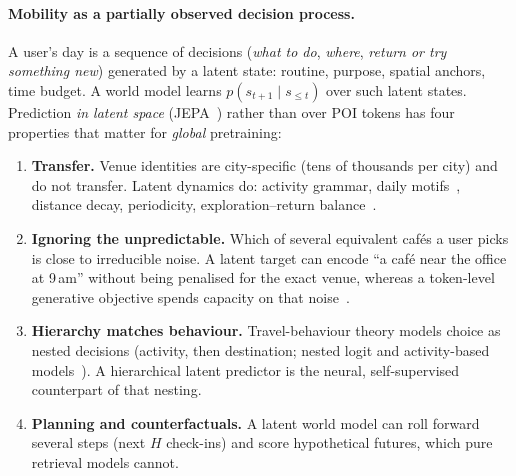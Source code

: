 \documentclass[10.5pt]{article}
\begin{document}
\paragraph{Mobility as a partially observed decision process.} A user's day is a sequence of decisions
(\emph{what to do}, \emph{where}, \emph{return or try something new}) generated by a latent state: routine, purpose,
spatial anchors, time budget. A world model learns $p(s_{t+1}\mid s_{\le t})$ over such latent states. Prediction
\emph{in latent space} (JEPA~\cite{lecun2022path,ijepa,vjepa}) rather than over POI tokens has four properties that
matter for \emph{global} pretraining:
\begin{enumerate}
\item \textbf{Transfer.} Venue identities are city-specific (tens of thousands per city) and do not transfer. Latent
dynamics do: activity grammar, daily motifs~\cite{motifs}, distance decay, periodicity, exploration--return
balance~\cite{epr}.
\item \textbf{Ignoring the unpredictable.} Which of several equivalent caf\'es a user picks is close to irreducible
noise. A latent target can encode ``a caf\'e near the office at 9\,am'' without being penalised for the exact venue,
whereas a token-level generative objective spends capacity on that noise~\cite{lecun2022path}.
\item \textbf{Hierarchy matches behaviour.} Travel-behaviour theory models choice as nested decisions (activity, then
destination; nested logit and activity-based models~\cite{benakiva,bowman}). A hierarchical latent predictor is the
neural, self-supervised counterpart of that nesting.
\item \textbf{Planning and counterfactuals.} A latent world model can roll forward several steps (next $H$ check-ins)
and score hypothetical futures, which pure retrieval models cannot.
\end{enumerate}
\end{document}
